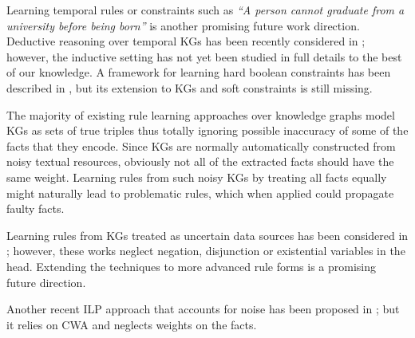 Learning temporal rules or constraints such as \emph{``A person cannot graduate from a university before being born''} is another promising future work direction. Deductive reasoning over temporal KGs has been recently considered in \cite{DBLP:conf/aaai/ChekolPSS17}; however, the inductive setting has not yet been studied in full details to the best of our knowledge. A framework for learning hard boolean constraints has been described in \cite{DBLP:conf/aaai/RaedtPT18}, but its extension to KGs and soft constraints is still missing. 

The majority of existing rule learning approaches over knowledge graphs model KGs as sets of true triples thus totally ignoring possible inaccuracy of some of the facts that they encode. Since KGs are normally automatically constructed from noisy textual resources, obviously not all of the extracted facts should have the same weight. Learning rules from such noisy KGs by treating all facts equally might naturally lead to problematic rules, which when applied could propagate faulty facts. 

Learning rules from KGs treated as uncertain data sources has  been considered in \cite{probfoil,DBLP:conf/ijcai/RaedtDTBV15,DBLP:conf/clima/CorapiSIR11}; however, these works neglect negation, disjunction or existential variables in the head. %
Extending the techniques to more advanced rule forms is a promising future direction.

Another recent ILP approach that accounts for noise has been proposed in \cite{sigmailp}; but it relies on CWA and neglects weights on the facts. %

